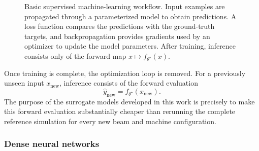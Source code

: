 \begin{figure}[H]
%
    \caption{
        Basic supervised machine-learning workflow. Input examples are propagated
        through a parameterized model to obtain predictions. A loss function
        compares the predictions with the ground-truth targets, and
        backpropagation provides gradients used by an optimizer to update the
        model parameters. After training, inference consists only of the forward
        map $x\mapsto f_{\theta^{\star}}(x)$.
    }
    \label{fig:basic_ml_pipeline}
\end{figure}

Once training is complete, the optimization loop is removed. For a previously unseen input $x_{\mathrm{new}}$, inference consists of the forward evaluation
\begin{equation}
    \widehat{y}_{\mathrm{new}}
    =
    f_{\theta^{\star}}
    \left(
    x_{\mathrm{new}}
    \right).
\end{equation}
The purpose of the surrogate models developed in this work is precisely to make this forward evaluation substantially cheaper than rerunning the complete reference simulation for every new beam and machine configuration.

\subsubsection{Dense neural networks}
\label{subsubsec:dense_neural_networks}

